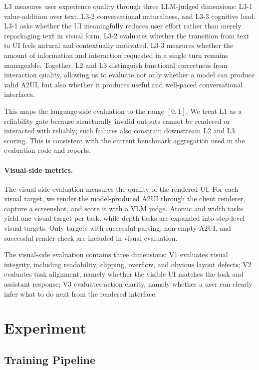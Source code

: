 \documentclass{llmxive}
\begin{document}
L3 measures user experience quality through three LLM-judged dimensions: L3-1 value-addition over text, L3-2 conversational naturalness, and L3-3 cognitive load. L3-1 asks whether the UI meaningfully reduces user effort rather than merely repackaging text in visual form. L3-2 evaluates whether the transition from text to UI feels natural and contextually motivated. L3-3 measures whether the amount of information and interaction requested in a single turn remains manageable. Together, L2 and L3 distinguish functional correctness from interaction quality, allowing us to evaluate not only whether a model can produce valid A2UI, but also whether it produces useful and well-paced conversational interfaces.


This maps the language-side evaluation to the range $[0,1]$. We treat L1 as a reliability gate because structurally invalid outputs cannot be rendered or interacted with reliably; such failures also constrain downstream L2 and L3 scoring. This is consistent with the current benchmark aggregation used in the evaluation code and reports.

\paragraph{Visual-side metrics.}
The visual-side evaluation measures the quality of the rendered UI. For each visual target, we render the model-produced A2UI through the client renderer, capture a screenshot, and score it with a VLM judge. Atomic and width tasks yield one visual target per task, while depth tasks are expanded into step-level visual targets. Only targets with successful parsing, non-empty A2UI, and successful render check are included in visual evaluation.

The visual-side evaluation contains three dimensions:
V1 evaluates visual integrity, including readability, clipping, overflow, and obvious layout defects;
V2 evaluates task alignment, namely whether the visible UI matches the task and assistant response;
V3 evaluates action clarity, namely whether a user can clearly infer what to do next from the rendered interface.

\section{Experiment}
\label{sec:exp}
\subsection{Training Pipeline}
\label{subsec:training-pipeline}
\end{document}
